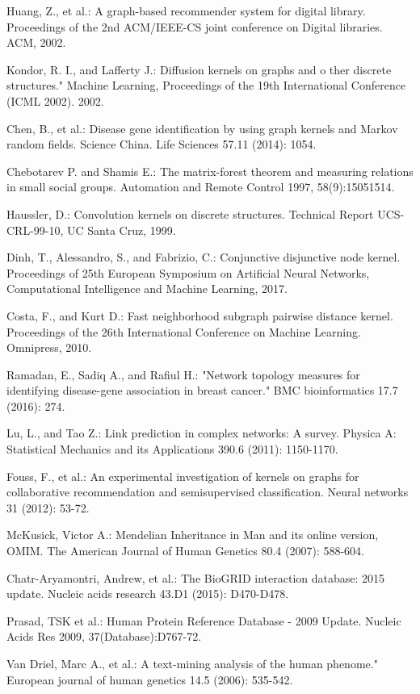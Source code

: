 \documentclass[runningheads,a4paper]{llncs}
\begin{document}
\begin{thebibliography}{4}

 Huang, Z., et al.: A graph-based recommender system for digital library. Proceedings of the 2nd ACM/IEEE-CS joint conference on Digital libraries. ACM, 2002. 

 Kondor, R. I., and Lafferty J.: Diffusion kernels on graphs and o ther discrete structures." Machine Learning, Proceedings of the 19th International Conference (ICML 2002). 2002.

 Chen, B., et al.: Disease gene identification by using graph kernels and Markov random fields. Science China. Life Sciences 57.11 (2014): 1054.

 Chebotarev P. and Shamis E.: The matrix-forest theorem and measuring relations in small social groups. Automation and Remote Control 1997, 58(9):15051514.

 Haussler, D.: Convolution kernels on discrete structures. Technical Report UCS-CRL-99-10, UC Santa Cruz, 1999.

 Dinh, T., Alessandro, S., and Fabrizio, C.: Conjunctive disjunctive node kernel. Proceedings of 25th European Symposium on Artificial Neural Networks, Computational Intelligence and Machine Learning, 2017.

 Costa, F., and Kurt D.: Fast neighborhood subgraph pairwise distance kernel. Proceedings of the 26th International Conference on Machine Learning. Omnipress, 2010.

 Ramadan, E., Sadiq A., and Rafiul H.: "Network topology measures for identifying disease-gene association in breast cancer." BMC bioinformatics 17.7 (2016): 274.

 Lu, L., and Tao Z.: Link prediction in complex networks: A survey. Physica A: Statistical Mechanics and its Applications 390.6 (2011): 1150-1170.

 Fouss, F., et al.: An experimental investigation of kernels on graphs for collaborative recommendation and semisupervised classification. Neural networks 31 (2012): 53-72.

 McKusick, Victor A.: Mendelian Inheritance in Man and its online version, OMIM. The American Journal of Human Genetics 80.4 (2007): 588-604.

 Chatr-Aryamontri, Andrew, et al.: The BioGRID interaction database: 2015 update. Nucleic acids research 43.D1 (2015): D470-D478.

 Prasad, TSK et al.: Human Protein Reference Database - 2009 Update. Nucleic Acids Res 2009, 37(Database):D767-72.

 Van Driel, Marc A., et al.: A text-mining analysis of the human phenome." European journal of human genetics 14.5 (2006): 535-542.

\end{thebibliography}
\end{document}
